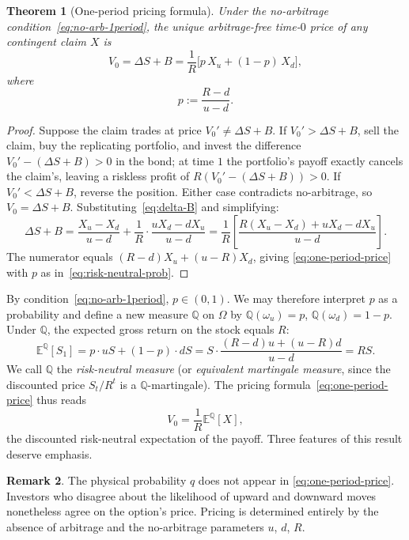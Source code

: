 \documentclass[11pt,a4paper]{article}
\theoremstyle{plain}
\newtheorem{theorem}{Theorem}[section]
\theoremstyle{definition}
\newtheorem{remark}[theorem]{Remark}
\newcommand{\E}{\mathbb{E}}
\newcommand{\Q}{\mathbb{Q}}
\begin{document}
\begin{theorem}[One-period pricing formula]
\label{thm:one-period-pricing}
Under the no-arbitrage condition~\eqref{eq:no-arb-1period}, the unique
arbitrage-free time-$0$ price of any contingent claim $X$ is
\begin{equation}
    \label{eq:one-period-price}
    V_0 = \Delta S + B = \frac{1}{R}\bigl[ p\, X_u + (1-p)\, X_d \bigr],
\end{equation}
where
\begin{equation}
    \label{eq:risk-neutral-prob}
    p := \frac{R - d}{u - d}.
\end{equation}
\end{theorem}

\begin{proof}
Suppose the claim trades at price $V_0' \neq \Delta S + B$. If
$V_0' > \Delta S + B$, sell the claim, buy the replicating portfolio, and
invest the difference $V_0' - (\Delta S + B) > 0$ in the bond; at time $1$
the portfolio's payoff exactly cancels the claim's, leaving a riskless
profit of $R(V_0' - (\Delta S + B)) > 0$. If $V_0' < \Delta S + B$, reverse
the position. Either case contradicts no-arbitrage, so $V_0 = \Delta S + B$.
Substituting~\eqref{eq:delta-B} and simplifying:
\[
\Delta S + B
= \frac{X_u - X_d}{u - d} + \frac{1}{R} \cdot \frac{u X_d - d X_u}{u - d}
= \frac{1}{R} \left[ \frac{R(X_u - X_d) + u X_d - d X_u}{u - d} \right].
\]
The numerator equals $(R - d) X_u + (u - R) X_d$, giving
\eqref{eq:one-period-price} with $p$ as in~\eqref{eq:risk-neutral-prob}.
\end{proof}

By condition~\eqref{eq:no-arb-1period}, $p \in (0, 1)$. We may therefore
interpret $p$ as a probability and define a new measure $\Q$ on $\Omega$
by $\Q(\omega_u) = p$, $\Q(\omega_d) = 1-p$. Under $\Q$, the expected
gross return on the stock equals $R$:
\[
\E^{\Q}[S_1] = p \cdot uS + (1-p) \cdot dS
= S \cdot \frac{(R-d)u + (u-R)d}{u-d} = RS.
\]
We call $\Q$ the \emph{risk-neutral measure} (or
\emph{equivalent martingale measure}, since the discounted price
$S_t / R^t$ is a $\Q$-martingale). The pricing
formula~\eqref{eq:one-period-price} thus reads
\begin{equation}
    \label{eq:risk-neutral-pricing}
    V_0 = \frac{1}{R} \E^{\Q}[X],
\end{equation}
the discounted risk-neutral expectation of the payoff. Three features of
this result deserve emphasis.

\begin{remark}
The physical probability $q$ does not appear in
\eqref{eq:one-period-price}. Investors who disagree about the likelihood of
upward and downward moves nonetheless agree on the option's price. Pricing
is determined entirely by the absence of arbitrage and the no-arbitrage
parameters $u$, $d$, $R$.
\end{remark}
\end{document}
